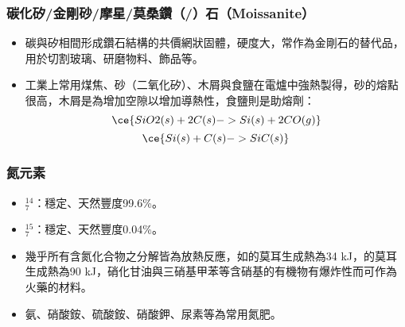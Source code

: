 \documentclass[a4paper,12pt]{report}
\begin{document}
\subsubsection{碳化矽/金剛砂/摩星/莫桑鑽（/）石（Moissanite）}
\begin{itemize}
\item 碳與矽相間形成鑽石結構的共價網狀固體，硬度大，常作為金剛石的替代品，用於切割玻璃、研磨物料、飾品等。
\item 工業上常用煤焦、砂（二氧化矽）、木屑與食鹽在電爐中強熱製得，砂的熔點很高，木屑是為增加空隙以增加導熱性，食鹽則是助熔劑：
\[\ce{SiO2(s) + 2C(s) -> Si(s) + 2CO(g)}\]
\[\ce{Si(s) + C(s) -> SiC(s)}\]
\end{itemize}
\subsubsection{氮元素}
\begin{itemize}
\item $^{14}_7$\rmN：穩定、天然豐度99.6\%。
\item $^{15}_7$\rmN：穩定、天然豐度0.04\%。
\item 幾乎所有含氮化合物之分解皆為放熱反應，如的莫耳生成熱為34 kJ，的莫耳生成熱為90 kJ，硝化甘油與三硝基甲苯等含硝基的有機物有爆炸性而可作為火藥的材料。
\item 氨、硝酸銨、硫酸銨、硝酸鉀、尿素等為常用氮肥。
\end{itemize}
\end{document}
